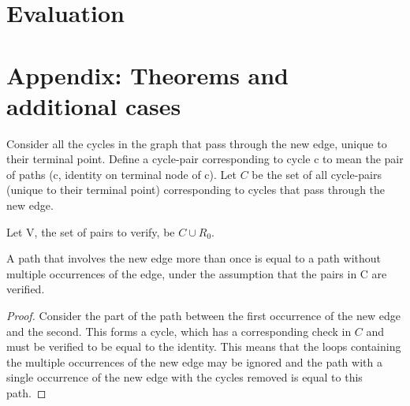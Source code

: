 \documentclass[sigplan,review,anonymous]{acmart}
\begin{document}
\section{Evaluation}

\section{Appendix: Theorems and additional cases}

Consider all the cycles in the graph that pass through the new edge, unique to their terminal point.
Define a cycle-pair corresponding to cycle c to mean the pair of paths (c, identity on terminal node of c).
Let $C$ be the set of all cycle-pairs (unique to their terminal point) corresponding to cycles that pass through the new edge.

Let V, the set of pairs to verify, be $C \cup R_0$.

\begin{lemma}
\label{one_occurence_lemma}
A path that involves the new edge more than once is equal to a path without multiple occurrences of the edge, under the assumption that the pairs in C are verified.
\end{lemma}
\begin{proof}
Consider the part of the path between the first occurrence of the new edge and the second. This forms a cycle, which has a corresponding check in $C$ and must be verified to be equal to the identity.
This means that the loops containing the multiple occurrences of the new edge may be ignored and the path with a single occurrence of the new edge with the cycles removed is equal to this path.
\end{proof}
\end{document}
